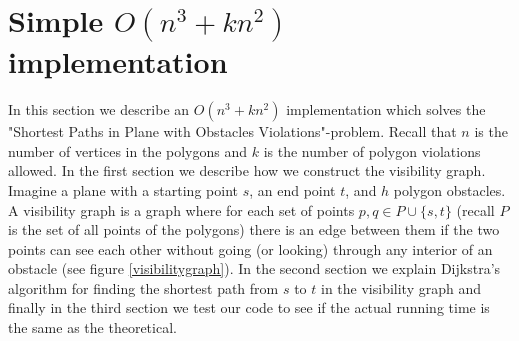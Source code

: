 \chapter{Simple $O(n^3 +k n^2)$ implementation}
In this section we describe an $O(n^3+k n^2)$ implementation which solves the
"Shortest Paths in Plane with Obstacles Violations"-problem. Recall that $n$ is
the number of vertices in the polygons and $k$ is the number of polygon
violations allowed. In the first section we describe how we construct the
visibility graph. Imagine a plane with a starting point $s$, an end point $t$,
and $h$ polygon obstacles. A visibility graph is a graph where for each set of
points  $p,q\in P \cup \{s,t\}$ (recall $P$ is the set of all points of the
polygons) there is an edge between them if the two points can see each other
without going (or looking) through any interior of an obstacle (see figure
\ref{visibilitygraph}). In the second section we explain Dijkstra's algorithm
for finding the shortest path from $s$ to $t$ in the visibility graph and
finally in the third section we test our code to see if the actual running time
is the same as the theoretical.

